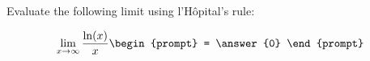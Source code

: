 \documentclass{ximera}
\author{Steven Gubkin}
\begin{document}
\begin{exercise}

Evaluate the following limit using l'H\^{o}pital's rule:

\[
\lim_{x \to \infty} \frac{\ln(x)}{x} \begin{prompt} = \answer{0} \end{prompt}
\]

\end{exercise}
\end{document}
